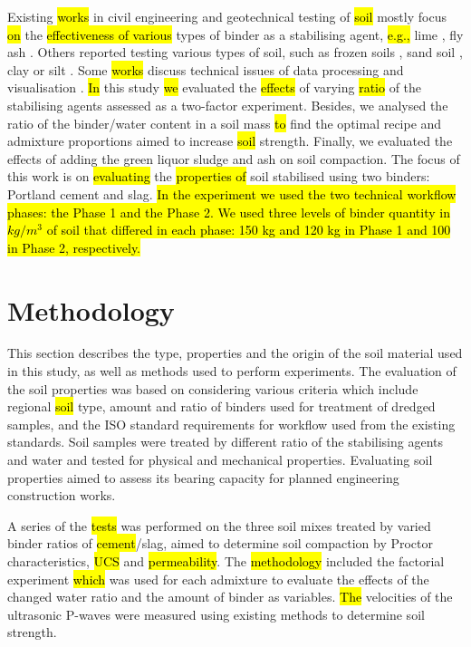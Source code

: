 \documentclass{amestyle}
\begin{document}
Existing \hl{works} in civil engineering and geotechnical testing of \hl{soil} mostly focus \hl{on} the \hl{effectiveness of various} types of binder as a stabilising agent, \hl{e.g.,} lime \cite{Rao,Mukhtar,Swaidani}, fly ash \cite{Phetchuay}. Others reported testing various types of soil, such as frozen soils \cite{Lemenkov2021b,Lemenkov2021c}, sand soil \cite{Robertson}, clay or silt \cite{Komal}. Some \hl{works} discuss technical issues of data processing and visualisation \cite{Kaellenetal2014,Lemenkov2021c}. \hl{In} this study \hl{we} evaluated the \hl{effects} of varying \hl{ratio} of the stabilising agents assessed as a two-factor experiment. Besides, we analysed the ratio of the binder/water content in a soil mass \hl{to} find the optimal recipe and admixture proportions aimed to increase \hl{soil} strength. Finally, we evaluated the effects of adding the green liquor sludge and ash on soil compaction. The focus of this work is on \hl{evaluating} the \hl{properties of} soil stabilised using two binders: Portland cement and slag. \hl{In the experiment we used the two technical workflow phases: the Phase 1 and the Phase 2. We used three levels of binder quantity in $kg/m^3$ of soil that differed in each phase: 150 kg and 120 kg in Phase 1 and 100 in Phase 2, respectively.}


\section{Methodology}
This section describes the type, properties and the origin of the soil material used in this study, as well as methods used to perform experiments. The evaluation of the soil properties was based on considering various criteria which include regional \hl{soil }type, amount and ratio of binders used for treatment of dredged samples, and the ISO standard requirements for workflow used from the existing standards. Soil samples were treated by different ratio of the stabilising agents and water and tested for physical and mechanical properties. Evaluating soil properties aimed to assess its bearing capacity for planned engineering construction works.

A series of the \hl{tests} was performed on the three soil mixes treated by varied binder ratios of \hl{cement}/slag, aimed to determine soil compaction by Proctor characteristics, \hl{UCS} and \hl{permeability}. The \hl{methodology} included the factorial experiment \hl{which} was used for each admixture to evaluate the effects of the changed water ratio and the amount of binder as variables. \hl{The} velocities of the ultrasonic P-waves were measured using existing\hl{ }methods \cite{Lindh202102} to determine soil strength. 
\end{document}

